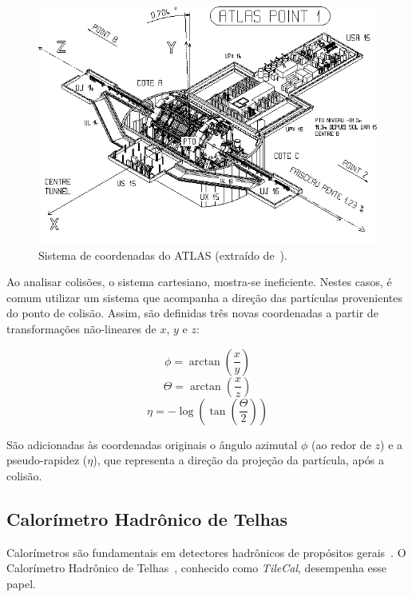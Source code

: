 \begin{figure}[htpb!]
    \centering
    \includegraphics[width=\textwidth]{images/atlas_coordinate_system.png}
    \caption[Sistema de coordenadas do ATLAS]{Sistema de coordenadas do ATLAS (extraído
    de~\cite{EGEDE1998}).}
    \label{fig:coordinates}
\end{figure}

Ao analisar colisões, o sistema cartesiano, mostra-se ineficiente. Nestes
casos, é comum utilizar um sistema que acompanha a direção das partículas
provenientes do ponto de colisão. Assim, são definidas três novas coordenadas
a partir de transformações não-lineares de $x$, $y$ e $z$:

\begin{equation}
    \phi = \arctan\left(\frac{x}{y}\right)
\end{equation}
\begin{equation}
    \Theta = \arctan\left(\frac{x}{z}\right)
\end{equation}
\begin{equation}
    \eta = -\log \left(\tan\left(\frac{\Theta}{2}\right)\right)
\end{equation}

São adicionadas às coordenadas originais o ângulo azimutal $\phi$ (ao
redor de $z$) e a pseudo-rapidez ($\eta$), que representa a direção da projeção
da partícula, após a colisão.

\subsection{Calorímetro Hadrônico de Telhas}

Calorímetros são fundamentais em detectores hadrônicos de propósitos
gerais~\cite{WIGMANS2000}.  O Calorímetro Hadrônico de
Telhas~\cite{ARIZTIZABAL1994}, conhecido como \emph{TileCal}, desempenha esse
papel.

